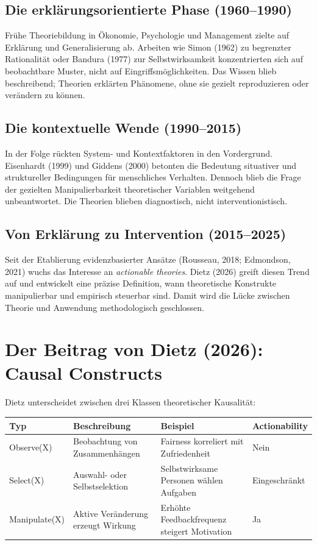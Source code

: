 \documentclass[12pt,a4paper]{article}
\begin{document}
\subsection{Die erklärungsorientierte Phase (1960--1990)}

Frühe Theoriebildung in Ökonomie, Psychologie und Management zielte auf Erklärung und Generalisierung ab.
Arbeiten wie Simon (1962) zu begrenzter Rationalität oder Bandura (1977) zur Selbstwirksamkeit konzentrierten sich auf beobachtbare Muster, nicht auf Eingriffsmöglichkeiten.
Das Wissen blieb beschreibend; Theorien erklärten Phänomene, ohne sie gezielt reproduzieren oder verändern zu können.

\subsection{Die kontextuelle Wende (1990--2015)}

In der Folge rückten System- und Kontextfaktoren in den Vordergrund.
Eisenhardt (1999) und Giddens (2000) betonten die Bedeutung situativer und struktureller Bedingungen für menschliches Verhalten.
Dennoch blieb die Frage der gezielten Manipulierbarkeit theoretischer Variablen weitgehend unbeantwortet.
Die Theorien blieben diagnostisch, nicht interventionistisch.

\subsection{Von Erklärung zu Intervention (2015--2025)}

Seit der Etablierung evidenzbasierter Ansätze (Rousseau, 2018; Edmondson, 2021) wuchs das Interesse an \textit{actionable theories}.
Dietz (2026) greift diesen Trend auf und entwickelt eine präzise Definition, wann theoretische Konstrukte manipulierbar und empirisch steuerbar sind.
Damit wird die Lücke zwischen Theorie und Anwendung methodologisch geschlossen.

\section{Der Beitrag von Dietz (2026): Causal Constructs}

Dietz unterscheidet zwischen drei Klassen theoretischer Kausalität:

\begin{center}
\begin{tabular}{llll}
\toprule
\textbf{Typ} & \textbf{Beschreibung} & \textbf{Beispiel} & \textbf{Actionability}\\
\midrule
Observe(X) & Beobachtung von Zusammenhängen & Fairness korreliert mit Zufriedenheit & Nein \\
Select(X) & Auswahl- oder Selbstselektion & Selbstwirksame Personen wählen Aufgaben & Eingeschränkt \\
Manipulate(X) & Aktive Veränderung erzeugt Wirkung & Erhöhte Feedbackfrequenz steigert Motivation & Ja \\
\bottomrule
\end{tabular}
\end{center}
\end{document}
